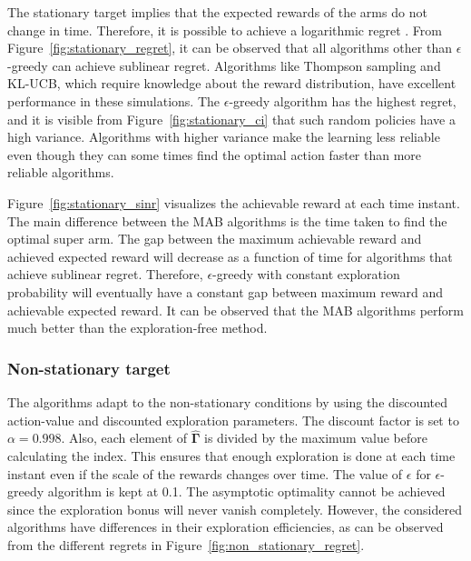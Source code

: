 \documentclass[english, 12pt, a4paper, elec, utf8, a-1b, online]{aaltothesis}
\newcommand{\vsinrb}{\widehat{\boldsymbol{\Gamma}}}
\begin{document}
The stationary target implies that the expected rewards of the arms do not change in time.
Therefore, it is possible to achieve a logarithmic regret \cite{Lattimore2019}.
From Figure~\ref{fig:stationary_regret}, it can be observed that all algorithms other than $\epsilon$-greedy can achieve sublinear regret.
Algorithms like Thompson sampling and KL-UCB, which require knowledge about the reward distribution, have excellent performance in these simulations.
The $\epsilon$-greedy algorithm has the highest regret, and it is visible from Figure~\ref{fig:stationary_ci} that such random policies have a high variance.
Algorithms with higher variance make the learning less reliable even though they can some times find the optimal action faster than more reliable algorithms.

Figure~\ref{fig:stationary_sinr} visualizes the achievable reward at each time instant.
The main difference between the MAB algorithms is the time taken to find the optimal super arm.
The gap between the maximum achievable reward and achieved expected reward will decrease as a function of time for algorithms that achieve sublinear regret.
Therefore, $\epsilon$-greedy with constant exploration probability will eventually have a constant gap between maximum reward and achievable expected reward.
It can be observed that the MAB algorithms perform much better than the exploration-free method.

\subsubsection{Non-stationary target}


The algorithms adapt to the non-stationary conditions by using the discounted action-value and discounted exploration parameters.
The discount factor is set to $\alpha = 0.998$.
Also, each element of $\vsinrb$ is divided by the maximum value before calculating the index.
This ensures that enough exploration is done at each time instant even if the scale of the rewards changes over time.
The value of $\epsilon$ for $\epsilon$-greedy algorithm is kept at 0.1.
The asymptotic optimality cannot be achieved since the exploration bonus will never vanish completely.
However, the considered algorithms have differences in their exploration efficiencies, as can be observed from the different regrets in Figure~\ref{fig:non_stationary_regret}.
\end{document}
